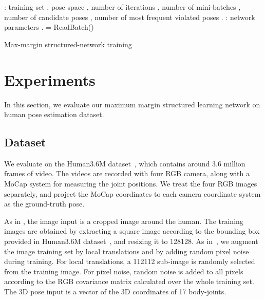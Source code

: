 \documentclass[10pt,twocolumn,letterpaper]{article}
\begin{document}
\begin{algorithm}[tbh]
\begin{algorithmic}
 :   training set , pose space , number of iterations , number of mini-batches , number of candidate poses , number of most frequent violated poses .
:  network parameters .
\STATE  \quad{}
\STATE  = ReadBatch() 
\STATE {}
\STATE  {}
\STATE   
\STATE {}
\STATE 
\FORALL {}
\STATE {}
\STATE 
\STATE  {}
\STATE   {}
\ENDFOR
\STATE {}
\STATE 
\STATE 
       \ENDFOR
\ENDFOR
\caption{Max-margin structured-network training}
  \label{algo:snlearn}
\end{algorithmic}

\end{algorithm}
\vspace{-0.2in}
\section{Experiments} 
\label{sec:Experiments}
\vspace{-0.1in}
In this section, we evaluate our maximum margin structured learning network on human pose estimation dataset.
\vspace{-0.3in}
\subsection{Dataset}
\vspace{-0.05in}
We evaluate on the Human3.6M dataset~\cite{h36m_pami}, which contains around 3.6 million frames of video. 
The videos are recorded with four RGB camera, along with a MoCap system for measuring the joint positions.
We treat the four RGB images separately, and project the MoCap coordinates to each camera coordinate system as the ground-truth pose. 

As in \cite{h36m_pami,accv2014}, the image input is a cropped image around the human.
The training images are obtained by extracting a square image according to the bounding box provided in Human3.6M dataset~\cite{h36m_pami}, and resizing it to 128128.
As in~\cite{Alex2012}, we augment the image training set by local translations and by adding random pixel noise during training.   
For local translations, a 112112 sub-image is randomly selected from the training image.
For pixel noise, random noise is added to all pixels according to the RGB covariance matrix calculated over the whole training set.
The 3D pose input is a vector of the 3D coordinates of 17 body-joints.
\end{document}
